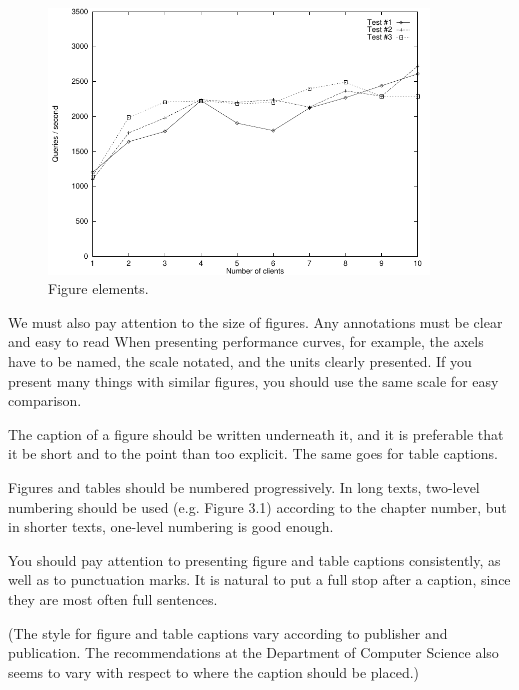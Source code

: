 \begin{figure}[ht]
\ \newline
\begin{center}
\includegraphics[width=0.9\textwidth]{kuvaesimerkki.pdf}
\caption{Figure elements.}
\label{kuvaesimerkki}
\end{center}
\end{figure}


We must also pay attention to the size of figures. Any annotations must be clear and easy to read When 
presenting performance curves, for example, the axels have to be named, the scale notated, and the units 
clearly presented. If you present many things with similar figures, you should use the same scale for easy comparison.

The caption of a figure should be written underneath it, and it is preferable that it be short and to 
the point than too explicit. The same goes for table captions.

Figures and tables should be numbered progressively. In long texts, two-level numbering should be 
used (e.g. Figure 3.1) according to the chapter number, but in shorter texts, one-level numbering is good enough.


You should pay attention to presenting figure and table captions consistently, as well as to punctuation 
marks. It is natural to put a full stop after a caption, since they are most often full sentences. 

(The style for figure and table captions vary according to publisher and publication. The recommendations 
at the Department of Computer Science also seems to vary with respect to where the caption should be placed.)


